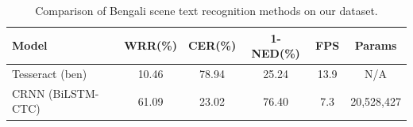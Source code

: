 \begin{table}[h]
\centering
\caption{Comparison of Bengali scene text recognition methods on our dataset.}
\label{tab:comparison}
\begin{tabular}{lccccc}
\toprule
Model & WRR(\%) & CER(\%) & 1-NED(\%) & FPS & Params \\
\midrule
Tesseract (ben) & 10.46 & 78.94 & 25.24 & 13.9 & N/A \\
CRNN (BiLSTM-CTC) & 61.09 & 23.02 & 76.40 & 7.3 & 20,528,427 \\
\bottomrule
\end{tabular}
\end{table}

